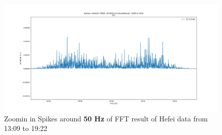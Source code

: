 \documentclass[
11pt, %
a4paper %
]{article}%
\theoremstyle{plain}
\begin{document}
\newpage
\begin{figure}[h]
	\centering
	\includegraphics[width=\textwidth]{Figure_2_3.png}
	\caption{Zoomin in Spikes around \textbf{50 Hz} of FFT result of Hefei data from 13:09 to 19:22}
	\label{fig:hefei2_3}
\end{figure}
\newpage
\end{document}
